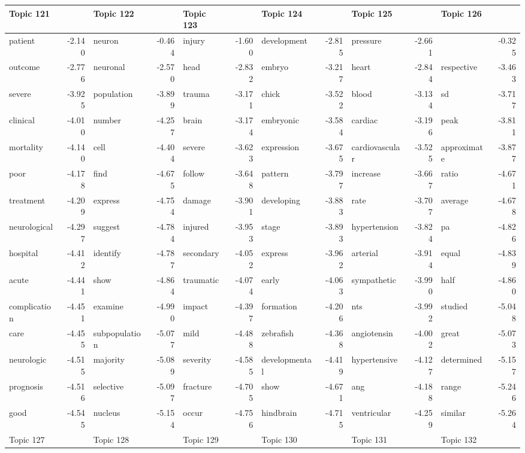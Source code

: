 \documentclass{article}
\begin{document}
\begin{table}
{\begin{tabular}{|l r|l r|l r|l r|l r|l r|}
\hline
\hline
Topic 121 & &Topic 122 & &Topic 123 & &Topic 124 & &Topic 125 & &Topic 126 &\\
\hline
patient & -2.140 & neuron & -0.464 & injury & -1.600 & development & -2.815 & pressure & -2.661 &  & -0.325\\
outcome & -2.776 & neuronal & -2.570 & head & -2.832 & embryo & -3.217 & heart & -2.844 & respective & -3.463\\
severe & -3.925 & population & -3.899 & trauma & -3.171 & chick & -3.522 & blood & -3.134 & sd & -3.717\\
clinical & -4.010 & number & -4.257 & brain & -3.174 & embryonic & -3.584 & cardiac & -3.196 & peak & -3.811\\
mortality & -4.140 & cell & -4.404 & severe & -3.623 & expression & -3.675 & cardiovascular & -3.525 & approximate & -3.877\\
poor & -4.178 & find & -4.675 & follow & -3.648 & pattern & -3.797 & increase & -3.667 & ratio & -4.671\\
treatment & -4.209 & express & -4.754 & damage & -3.901 & developing & -3.883 & rate & -3.707 & average & -4.678\\
neurological & -4.297 & suggest & -4.784 & injured & -3.953 & stage & -3.893 & hypertension & -3.824 & pa & -4.826\\
hospital & -4.412 & identify & -4.787 & secondary & -4.052 & express & -3.962 & arterial & -3.914 & equal & -4.839\\
acute & -4.441 & show & -4.864 & traumatic & -4.074 & early & -4.063 & sympathetic & -3.990 & half & -4.860\\
complication & -4.451 & examine & -4.990 & impact & -4.397 & formation & -4.206 & nts & -3.992 & studied & -5.048\\
care & -4.455 & subpopulation & -5.077 & mild & -4.488 & zebrafish & -4.368 & angiotensin & -4.002 & great & -5.073\\
neurologic & -4.515 & majority & -5.089 & severity & -4.585 & developmental & -4.419 & hypertensive & -4.127 & determined & -5.157\\
prognosis & -4.516 & selective & -5.097 & fracture & -4.705 & show & -4.671 & ang & -4.188 & range & -5.246\\
good & -4.545 & nucleus & -5.154 & occur & -4.756 & hindbrain & -4.715 & ventricular & -4.259 & similar & -5.264\\
\hline
\hline
Topic 127 & &Topic 128 & &Topic 129 & &Topic 130 & &Topic 131 & &Topic 132 &\\
\hline

\end{tabular}}
\end{table}
\end{document}
